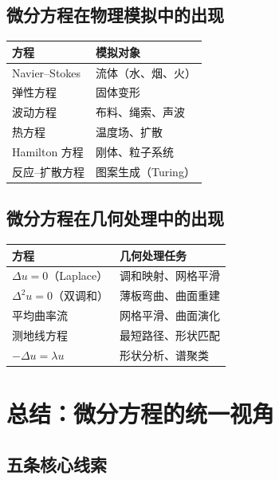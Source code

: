 \subsection{微分方程在物理模拟中的出现}

\begin{center}
\begin{tabular}{p{4cm}p{5cm}}
\toprule
\textbf{方程} & \textbf{模拟对象} \\
\midrule
Navier--Stokes & 流体（水、烟、火） \\
弹性方程 & 固体变形 \\
波动方程 & 布料、绳索、声波 \\
热方程 & 温度场、扩散 \\
Hamilton 方程 & 刚体、粒子系统 \\
反应--扩散方程 & 图案生成（Turing） \\
\bottomrule
\end{tabular}
\end{center}

\subsection{微分方程在几何处理中的出现}

\begin{center}
\begin{tabular}{p{4cm}p{5cm}}
\toprule
\textbf{方程} & \textbf{几何处理任务} \\
\midrule
$\Delta u = 0$（Laplace） & 调和映射、网格平滑 \\
$\Delta^2 u = 0$（双调和） & 薄板弯曲、曲面重建 \\
平均曲率流 & 网格平滑、曲面演化 \\
测地线方程 & 最短路径、形状匹配 \\
$-\Delta u = \lambda u$ & 形状分析、谱聚类 \\
\bottomrule
\end{tabular}
\end{center}

\section{总结：微分方程的统一视角}

\subsection{五条核心线索}

